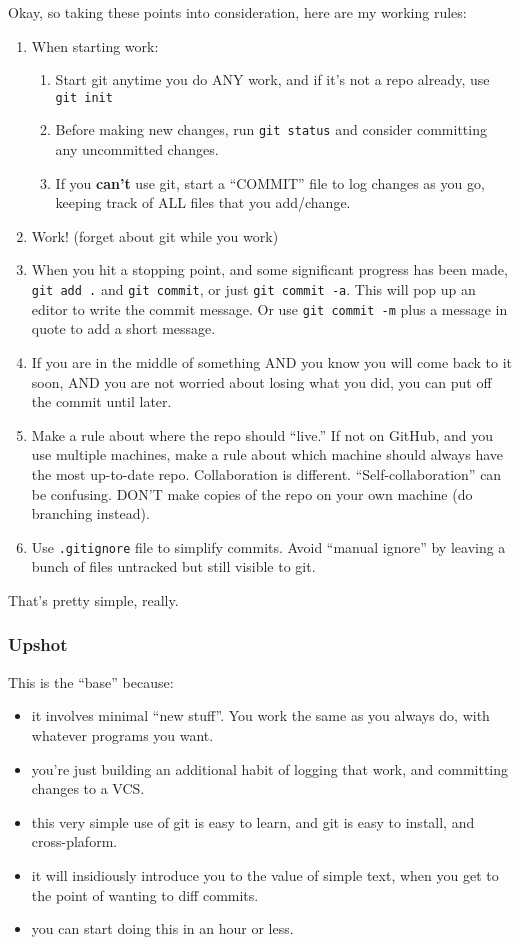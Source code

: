\documentclass[11pt]{article}
\begin{document}
Okay, so taking these points into consideration, here are my working rules:
\begin{enumerate}
\item When starting work:
\begin{enumerate}
\item Start git anytime you do ANY work, and if it's not a repo already, use \texttt{git init}
\item Before making new changes, run \texttt{git status} and consider committing any uncommitted changes.
\item If you \textbf{can't} use git, start a ``COMMIT'' file to log changes as you go, keeping track of ALL files that you add/change.
\end{enumerate}
\item Work! (forget about git while you work)
\item When you hit a stopping point, and some significant progress has been made, \texttt{git add .} and \texttt{git commit}, or just \texttt{git commit -a}.  This will pop up an editor to write the commit message.  Or use \texttt{git commit -m} plus a message in quote to add a short message.
\item If you are in the middle of something AND you know you will come back to it soon, AND you are not worried about losing what you did, you can put off the commit until later.
\item Make a rule about where the repo should ``live.''  If not on GitHub, and you use multiple machines, make a rule about which machine should always have the most up-to-date repo.  Collaboration is different. ``Self-collaboration'' can be confusing.  DON'T make copies of the repo on your own machine (do branching instead).
\item Use \texttt{.gitignore} file to simplify commits. Avoid ``manual ignore'' by leaving a bunch of files untracked but still visible to git.
\end{enumerate}

That's pretty simple, really.
\subsubsection{Upshot}
\label{sec-3-2-4}

This is the ``base'' because:
\begin{itemize}
\item it involves minimal ``new stuff''.  You work the same as you always do, with whatever programs you want.
\item you're just building an additional habit of logging that work, and committing changes to a VCS.
\item this very simple use of git is easy to learn, and git is easy to install, and cross-plaform.
\item it will insidiously introduce you to the value of simple text, when you get to the point of wanting to diff commits.
\item you can start doing this in an hour or less.
\end{itemize}
\end{document}
